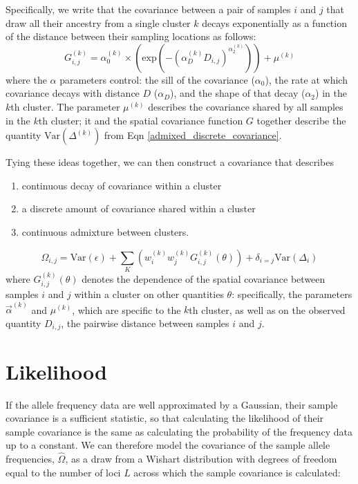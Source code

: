 \documentclass[12pt]{article}
\begin{document}
Specifically, we write that the covariance between a pair of samples $i$ and $j$
that draw all their ancestry from a single cluster $k$ decays exponentially as a function 
of the distance between their sampling locations as follows:
\begin{equation}
G^{(k)}_{i,j} = \alpha^{(k)}_0 \times \left(\text{exp} \left(  -(\alpha^{(k)}_D D_{i,j})^{\alpha^{(k)}_2}\right) \right) + \mu^{(k)}	
\label{spatial_cov}
\end{equation}
where the $\alpha$ parameters control: 
the sill of the covariance ($\alpha_0$), 
the rate at which covariance decays with distance $D$ ($\alpha_D$),
and the shape of that decay ($\alpha_2$)
in the $k$th cluster.
The parameter $\mu^{(k)}$ describes the covariance shared by all samples in the $k$th cluster;
it and the spatial covariance function $G$ together
 describe the quantity $\text{Var}(\Delta^{(k)})$ from Eqn \eqref{admixed_discrete_covariance}.

Tying these ideas together, we can then construct a covariance that describes
\begin{enumerate}
\item continuous decay of covariance within a cluster
\item a discrete amount of covariance shared within a cluster
\item continuous admixture between clusters.
\end{enumerate}

\begin{equation}
\Omega_{i,j} = \text{Var}(\epsilon) + \sum\limits_K \left(	w^{(k)}_iw^{(k)}_j G^{(k)}_{i,j}(\theta) 	\right) +
\delta_{i=j} \text{Var}(\Delta_i)
\label{admixed_spatial_cov}
\end{equation}
%
where $G^{(k)}_{i,j}(\theta)$ denotes the dependence of the spatial covariance between samples $i$ and $j$ 
within a cluster on other quantities $\theta$: 
specifically, the parameters $\vec{\alpha}^{(k)}$ and $\mu^{(k)}$, which are specific to the $k$th cluster, 
as well as on the observed quantity $D_{i,j}$, the pairwise distance between samples $i$ and $j$.

\section{Likelihood}
If the allele frequency data are well approximated by a Gaussian, 
their sample covariance is a sufficient statistic,
so that calculating the likelihood of their sample covariance is the same as 
calculating the probability of the frequency data up to a constant. 
We can therefore model the covariance of the sample allele frequencies, $\widehat{\Omega}$, 
as a draw from a Wishart distribution with degrees of freedom equal to 
the number of loci $L$ across which the sample covariance is calculated:
\end{document}
